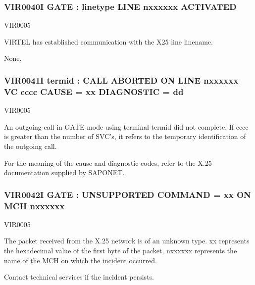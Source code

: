 \documentclass[letterpaper,10pt,english]{sphinxmanual}
\begin{document}
\subsubsection{VIR0040I GATE : linetype LINE n\sphinxhyphen{}xxxxxx ACTIVATED}
\label{\detokenize{messages:vir0040i-gate-linetype-line-n-xxxxxx-activated}}\begin{description}
\sphinxAtStartPar
VIR0005

\sphinxAtStartPar
VIRTEL has established communication with the X25 line linename.

\sphinxAtStartPar
None.

\end{description}


\subsubsection{VIR0041I termid : CALL ABORTED ON LINE n\sphinxhyphen{}xxxxxx VC cccc CAUSE = xx DIAGNOSTIC = dd}
\label{\detokenize{messages:vir0041i-termid-call-aborted-on-line-n-xxxxxx-vc-cccc-cause-xx-diagnostic-dd}}\begin{description}
\sphinxAtStartPar
VIR0005

\sphinxAtStartPar
An outgoing call in GATE mode using terminal termid did not complete. If cccc is greater than the number of SVC’s, it refers to the temporary identification of the outgoing call.

\sphinxAtStartPar
For the meaning of the cause and diagnostic codes, refer to the X.25 documentation supplied by SAPONET.

\end{description}


\subsubsection{VIR0042I GATE : UNSUPPORTED COMMAND = xx ON MCH n\sphinxhyphen{}xxxxxx}
\label{\detokenize{messages:vir0042i-gate-unsupported-command-xx-on-mch-n-xxxxxx}}\begin{description}
\sphinxAtStartPar
VIR0005

\sphinxAtStartPar
The packet received from the X.25 network is of an unknown type. xx represents the hexadecimal value of the first byte of the packet, n\sphinxhyphen{}xxxxxx represents the name of the MCH on which the incident occurred.

\sphinxAtStartPar
Contact technical services if the incident persists.

\end{description}
\end{document}
